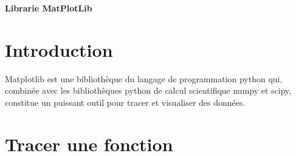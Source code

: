 \documentclass[a4]{article}
\begin{document}
 \noindent
  \thispagestyle{empty}

  \vspace{-0.8cm}
  \noindent
  {\huge{\bf Librarie MatPlotLib}}

  \section{Introduction}
  Matplotlib est une bibliothèque du langage de programmation python qui, combinée avec les bibliothèques python de calcul scientifique numpy et scipy, constitue un puissant outil pour tracer et visualiser des données.

  \section{Tracer une fonction}
\end{document}
